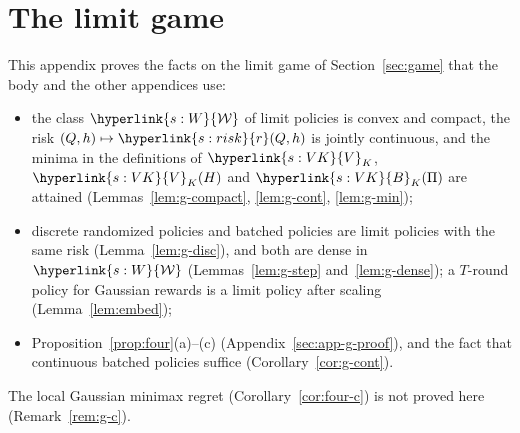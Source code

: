 \documentclass[11pt]{article}
\DeclareRobustCommand{\sy}[2]{{\hyperlink{#1}{#2}}}
\newcommand{\1}{\mathbf{1}}
\newcommand{\Wc}{\sy{s:W}{\mathcal W}}
\newcommand{\rk}{\sy{s:risk}{r}}
\newcommand{\VK}{\sy{s:VK}{V}}
\newcommand{\BK}{\sy{s:VK}{B}}
\begin{document}
\newcommand{\gSmp}{\sy{g:not}{\Lambda_K}}
\newcommand{\gGp}{\sy{g:not}{\Delta}}
\newcommand{\gsp}[1]{\sy{g:not}{\|#1\|_{\mathrm{sp}}}}
\newcommand{\ggh}{\sy{g:not}{g}}
\newcommand{\gFh}{\sy{g:not}{F}}
\newcommand{\gPf}{\sy{g:not}{\mathcal P_{\mathrm f}}}
\newcommand{\gOs}{\sy{g:pol}{\Omega^\circ}}
\newcommand{\gPh}{\sy{g:pol}{\mathbb P}}
\newcommand{\gEh}{\sy{g:pol}{\mathbb E}}
\newcommand{\gWi}{\sy{g:pol}{\mathbb W}}
\newcommand{\gDc}{\sy{g:pol}{\mathcal D}}
\newcommand{\gBc}{\sy{g:pol}{\mathcal D^\flat}}
\newcommand{\gQp}[1]{\sy{g:pol}{Q^{#1}}}
\newcommand{\gG}{\sy{g:cell}{\mathcal G}}
\newcommand{\ggam}{\sy{g:cell}{\gamma}}
\newcommand{\gMc}{\sy{g:mart}{\mathcal M}}
\newcommand{\gPhi}{\sy{g:act}{\Phi}}
\newcommand{\gTc}{\sy{g:act}{T}}
\newcommand{\gRs}{\sy{g:act}{R}}
\newcommand{\gPs}{\sy{g:act}{P}}
\newcommand{\gJ}{\sy{g:act}{J}}

\section{The limit game}\label{sec:app-game}


\medskip
\noindent This appendix proves the facts on the limit game of Section~\ref{sec:game} that the body and the other appendices use:
\begin{itemize}
\item the class $\Wc$ of limit policies is convex and compact, the risk $(Q,h)\mapsto\rk(Q,h)$ is jointly continuous, and the minima in the definitions of $\VK_K$,
$\VK_K(H)$ and $\BK_K(\Pi)$ are attained (Lemmas~\ref{lem:g-compact}, \ref{lem:g-cont}, \ref{lem:g-min});
\item discrete randomized policies and batched policies are limit policies with the same risk (Lemma~\ref{lem:g-disc}), and both are dense in $\Wc$
(Lemmas~\ref{lem:g-step} and~\ref{lem:g-dense}); a $T$-round policy for Gaussian rewards is a limit policy after scaling (Lemma~\ref{lem:embed});
\item Proposition~\ref{prop:four}(a)--(c) (Appendix~\ref{sec:app-g-proof}), and the fact that continuous batched policies suffice (Corollary~\ref{cor:g-cont}).
\end{itemize}
The local Gaussian minimax regret (Corollary~\ref{cor:four-c}) is not proved here (Remark~\ref{rem:g-c}).
\end{document}
